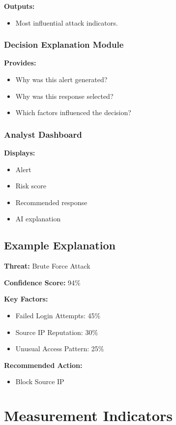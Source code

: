 \documentclass[12pt,a4paper]{report}
\begin{document}
\textbf{Outputs:}
\begin{itemize}
    \item Most influential attack indicators.
\end{itemize}

\subsubsection{Decision Explanation Module}
\textbf{Provides:}
\begin{itemize}
    \item Why was this alert generated?
    \item Why was this response selected?
    \item Which factors influenced the decision?
\end{itemize}

\subsubsection{Analyst Dashboard}
\textbf{Displays:}
\begin{itemize}
    \item Alert
    \item Risk score
    \item Recommended response
    \item AI explanation
\end{itemize}

\subsection{Example Explanation}
\textbf{Threat:} Brute Force Attack

\textbf{Confidence Score:} 94\%

\textbf{Key Factors:}
\begin{itemize}
    \item Failed Login Attempts: 45\%
    \item Source IP Reputation: 30\%
    \item Unusual Access Pattern: 25\%
\end{itemize}

\textbf{Recommended Action:}
\begin{itemize}
    \item Block Source IP
\end{itemize}

\section{Measurement Indicators}
\label{sec:measurement}
\end{document}
